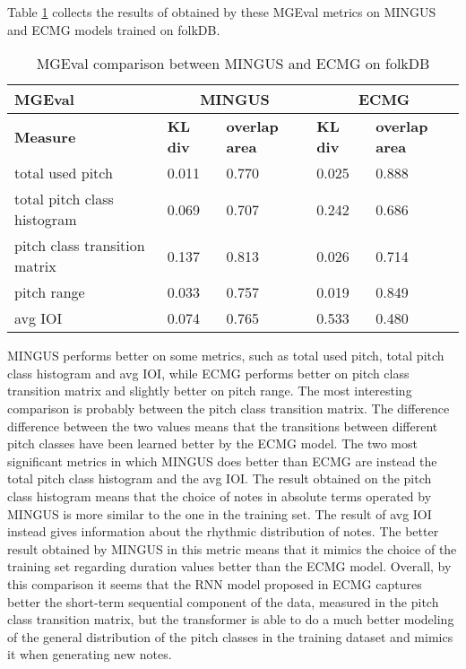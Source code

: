 \documentclass{article}
\begin{document}
Table \ref{tab:MGEval folkDB} collects the results of obtained by these MGEval metrics on MINGUS and ECMG models trained on folkDB.

\begin{table}[htbp]
	\caption{MGEval comparison between MINGUS and ECMG on folkDB}
	\begin{center}
		\begin{tabular}{ p{5cm} p{1.5cm} p{2.2cm} p{1.5cm} p{2.2cm}  }
            \hline
            MGEval & 
            \multicolumn{2}{c}{\textbf{MINGUS}} & 
            \multicolumn{2}{c}{\textbf{ECMG}} \\
            \hline
            \textbf{Measure} &  
            \textbf{KL div} & 
            \textbf{overlap area} &
            \textbf{KL div} & 
            \textbf{overlap area} \\
            \hline
            \hline
            total used pitch & 0.011 & 0.770 & 0.025 & 0.888 \\
            total pitch class histogram & 0.069 & 0.707 & 0.242 & 0.686 \\
            pitch class transition matrix & 0.137 & 0.813 & 0.026 & 0.714 \\
            pitch range & 0.033 & 0.757 & 0.019 & 0.849 \\
            avg IOI & 0.074 & 0.765 & 0.533 & 0.480 \\
            \hline
    \end{tabular}
	\label{tab:MGEval folkDB}
	\end{center}
\end{table}

MINGUS performs better on some metrics, such as total used pitch, total pitch class histogram and avg IOI, while ECMG performs better on pitch class transition matrix and slightly better on pitch range. The most interesting comparison is probably between the pitch class transition matrix. The difference difference between the two values means that the transitions between different pitch classes have been learned better by the ECMG model. The two most significant metrics in which MINGUS does better than ECMG are instead the total pitch class histogram and the avg IOI. The result obtained on the pitch class histogram means that the choice of notes in absolute terms operated by MINGUS is more similar to the one in the training set. The result of avg IOI instead gives information about the rhythmic distribution of notes. The better result obtained by MINGUS in this metric means that it mimics the choice of the training set regarding duration values better than the ECMG model.
Overall, by this comparison it seems that the RNN model proposed in ECMG captures better the short-term sequential component of the data, measured in the pitch class transition matrix, but the transformer is able to do a much better modeling of the general distribution of the pitch classes in the training dataset and mimics it when generating new notes. 
\end{document}
